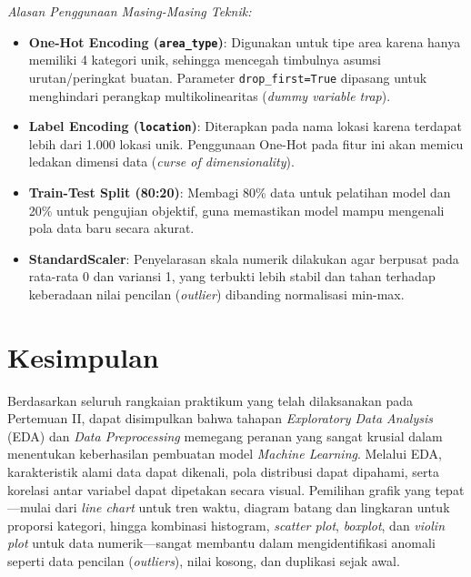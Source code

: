 \documentclass[a4paper,oneside,12pt]{report}
\begin{document}
\begin{enumerate}
    \textit{Alasan Penggunaan Masing-Masing Teknik:}
    \begin{itemize}
        \item \textbf{One-Hot Encoding (\texttt{area\_type})}: Digunakan untuk tipe area karena hanya memiliki 4 kategori unik, sehingga mencegah timbulnya asumsi urutan/peringkat buatan. Parameter \texttt{drop\_first=True} dipasang untuk menghindari perangkap multikolinearitas (\textit{dummy variable trap}).
        \item \textbf{Label Encoding (\texttt{location})}: Diterapkan pada nama lokasi karena terdapat lebih dari 1.000 lokasi unik. Penggunaan One-Hot pada fitur ini akan memicu ledakan dimensi data (\textit{curse of dimensionality}).
        \item \textbf{Train-Test Split (80:20)}: Membagi 80\% data untuk pelatihan model dan 20\% untuk pengujian objektif, guna memastikan model mampu mengenali pola data baru secara akurat.
        \item \textbf{StandardScaler}: Penyelarasan skala numerik dilakukan agar berpusat pada rata-rata 0 dan variansi 1, yang terbukti lebih stabil dan tahan terhadap keberadaan nilai pencilan (\textit{outlier}) dibanding normalisasi min-max.
    \end{itemize}
\end{enumerate}

\clearpage

\chapter{Kesimpulan}
Berdasarkan seluruh rangkaian praktikum yang telah dilaksanakan pada Pertemuan II, dapat disimpulkan bahwa tahapan \textit{Exploratory Data Analysis} (EDA) dan \textit{Data Preprocessing} memegang peranan yang sangat krusial dalam menentukan keberhasilan pembuatan model \textit{Machine Learning}. Melalui EDA, karakteristik alami data dapat dikenali, pola distribusi dapat dipahami, serta korelasi antar variabel dapat dipetakan secara visual. Pemilihan grafik yang tepat—mulai dari \textit{line chart} untuk tren waktu, diagram batang dan lingkaran untuk proporsi kategori, hingga kombinasi histogram, \textit{scatter plot}, \textit{boxplot}, dan \textit{violin plot} untuk data numerik—sangat membantu dalam mengidentifikasi anomali seperti data pencilan (\textit{outliers}), nilai kosong, dan duplikasi sejak awal.
\end{document}
